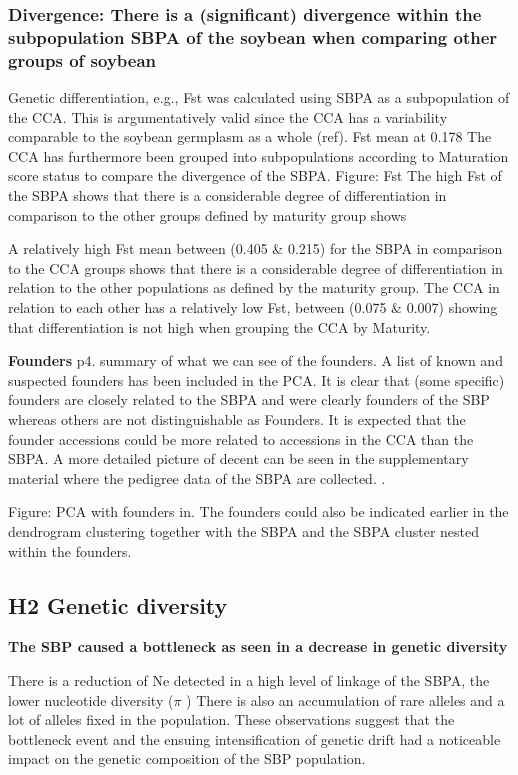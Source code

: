 \documentclass[9pt, onecolumn,twoside]{gsajnl}
\begin{document}
\subsubsection{Divergence: There is a (significant) divergence within the subpopulation SBPA of the soybean when comparing other groups of soybean}

Genetic differentiation, e.g., Fst was calculated using SBPA as a subpopulation of the CCA. This is argumentatively valid since the CCA has a variability comparable to the soybean germplasm as a whole (ref). Fst mean at 0.178
The CCA has furthermore been grouped into subpopulations according to Maturation score status to compare the divergence of the SBPA. 
Figure: Fst
The high Fst of the SBPA shows that there is a considerable degree of differentiation in comparison to the other groups defined by maturity group shows 

A relatively high Fst mean between (0.405 \& 0.215) for the SBPA in comparison to the CCA groups shows that there is a considerable degree of differentiation in relation to the other populations as defined by the maturity group. 
The CCA in relation to each other has a relatively low Fst, between (0.075 \& 0.007) showing that differentiation is not high when grouping the CCA by Maturity. 


\textbf{Founders}
p4. summary of what we can see of the founders. 
A list of known and suspected founders has been included in the PCA. It is clear that (some specific) founders are closely related to the SBPA and were clearly founders of the SBP whereas others are not distinguishable as Founders. It is expected that the founder accessions could be more related to accessions in the CCA than the SBPA. A more detailed picture of decent can be seen in the supplementary material where the pedigree data of the SBPA are collected. .

Figure: PCA with founders in. 
The founders could also be indicated earlier in the dendrogram clustering together with the SBPA and the SBPA cluster nested within the founders. 


\subsection{H2 Genetic diversity} 



\textbf{The SBP caused a bottleneck as seen in a decrease in genetic diversity }

There is a reduction of Ne detected in a high level of linkage of the SBPA, the lower nucleotide diversity ($\pi$ ) There is also an accumulation of rare alleles and a lot of alleles fixed in the population. These observations suggest that the bottleneck event and the ensuing intensification of genetic drift had a noticeable impact on the genetic composition of the SBP population.
\end{document}
